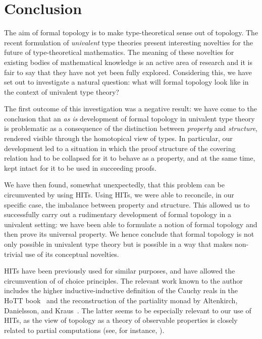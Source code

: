 \chapter{Conclusion}\label{chap:conc}

The aim of formal topology is to make type-theoretical sense out of topology. The recent
formulation of \emph{univalent} type theories present interesting novelties for the future
of type-theoretical mathematics. The meaning of these novelties for existing bodies of
mathematical knowledge is an active area of research and it is fair to say that they have
not yet been fully explored. Considering this, we have set out to investigate a
natural question: what will formal topology look like in the context of univalent type
theory?

The first outcome of this investigation was a negative result: we have come to the
conclusion that an \emph{as is} development of formal topology in univalent type theory is
problematic as a consequence of the distinction between \emph{property} and
\emph{structure}, rendered visible through the homotopical view of types. In particular,
our development led to a situation in which the proof structure of the covering relation
had to be collapsed for it to behave as a property, and at the same time, kept intact for
it to be used in succeeding proofs.

We have then found, somewhat unexpectedly, that this problem can be circumvented by using
HITs. Using HITs, we were able to reconcile, in our specific case, the imbalance between
property and structure. This allowed us to successfully carry out a rudimentary
development of formal topology in a univalent setting: we have been able to formulate a
notion of formal topology and then prove its universal property. We hence conclude that
formal topology is not only possible in univalent type theory but is possible in a way
that makes non-trivial use of its conceptual novelties.

HITs have been previously used for similar purposes, and have allowed the circumvention of
of choice principles. The relevant work known to the author includes the higher
inductive-inductive definition of the Cauchy reals in the HoTT
book~\cite[Defn.~11.3.2]{hottbook} and the reconstruction of the partiality monad by
Altenkirch, Danielsson, and Kraus~\cite{partiality-revisited}. The latter seems to be
especially relevant to our use of HITs, as the view of topology as a theory of observable
properties is closely related to partial computations (see, for instance,
\cite{synthetic-topology, shulman-logic-of-space}).

